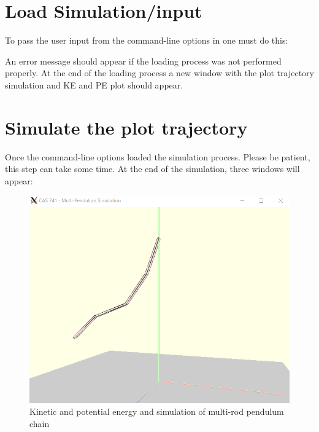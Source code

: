 \documentclass[12pt, titlepage]{article}
\begin{document}


\section{Load Simulation/input}

To pass the user input from the command-line options in \progname{} 
one must do this:

An error message should appear if the loading process was not 
performed properly. At the end of the loading process a new window with the 
plot trajectory simulation and KE and PE plot should appear.




\section{Simulate the plot trajectory}

Once the command-line options loaded the simulation process. 
Please be patient, this step can take some time. 
At the end of the simulation, three windows will appear:

\begin{figure}[H]
	\centering
	\includegraphics[width=500px]{MPSim.PNG}
	\caption{Kinetic and potential energy and simulation
	of multi-rod pendulum chain}
	\label{fig:PE-pend}
\end{figure}
\end{document}
